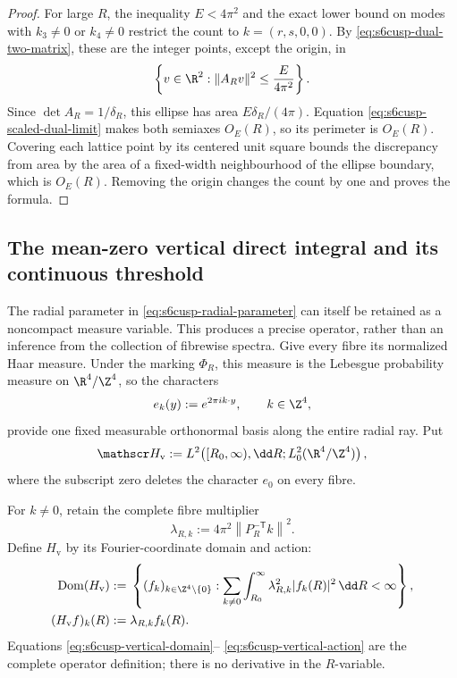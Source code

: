 \begin{proof}
For large \(R\), the inequality \(E<4\pi^2\) and the exact lower bound on
modes with \(k_3\ne0\) or \(k_4\ne0\) restrict the count to
\(k=(r,s,0,0)\).  By \eqref{eq:s6cusp-dual-two-matrix}, these are the
integer points, except the origin, in
\[
 \left\{v\in\R^2:\lVert A_Rv\rVert^2\le\frac{E}{4\pi^2}\right\}.
\]
Since \(\det A_R=1/\delta_R\), this ellipse has area
\(E\delta_R/(4\pi)\).  Equation
\eqref{eq:s6cusp-scaled-dual-limit} makes both semiaxes \(O_E(R)\), so its
perimeter is \(O_E(R)\).  Covering each lattice point by its centered unit
square bounds the discrepancy from area by the area of a fixed-width
neighbourhood of the ellipse boundary, which is \(O_E(R)\).  Removing the
origin changes the count by one and proves the formula.
\end{proof}

\subsection{The mean-zero vertical direct integral and its continuous
threshold}

The radial parameter in \eqref{eq:s6cusp-radial-parameter} can itself be
retained as a noncompact measure variable.  This produces a precise
operator, rather than an inference from the collection of fibrewise
spectra.  Give every fibre its normalized Haar measure.  Under the marking
\(\Phi_R\), this measure is the Lebesgue probability measure on
\(\R^4/\Z^4\), so the characters
\[
 e_k(y):=e^{2\pi i k\cdot y},\qquad k\in\Z^4,
\]
provide one fixed measurable orthonormal basis along the entire radial
ray.  Put
\begin{equation}\label{eq:s6cusp-vertical-Hilbert-space}
 \mathscr H_{\mathrm v}:=
 L^2\!\left([R_0,\infty),\dd R;
 L^2_0(\R^4/\Z^4)\right),
\end{equation}
where the subscript zero deletes the character \(e_0\) on every fibre.

For \(k\ne0\), retain the complete fibre multiplier
\begin{equation}\label{eq:s6cusp-vertical-multiplier}
 \lambda_{R,k}:=4\pi^2
 \left\lVert P_R^{-\mathsf T}k\right\rVert^2.
\end{equation}
Define \(H_{\mathrm v}\) by its Fourier-coordinate domain and action:
\begin{align}
 \operatorname{Dom}(H_{\mathrm v})
 &:={}
 \left\{
 (f_k)_{k\in\Z^4\setminus\{0\}}:
 \sum_{k\ne0}\int_{R_0}^{\infty}
 \lambda_{R,k}^{2}|f_k(R)|^2\,\dd R<\infty
 \right\},
 \label{eq:s6cusp-vertical-domain}\\
 (H_{\mathrm v}f)_k(R)&:=\lambda_{R,k}f_k(R).
 \label{eq:s6cusp-vertical-action}
\end{align}
Equations \eqref{eq:s6cusp-vertical-domain}--
\eqref{eq:s6cusp-vertical-action} are the complete operator definition;
there is no derivative in the \(R\)-variable.


